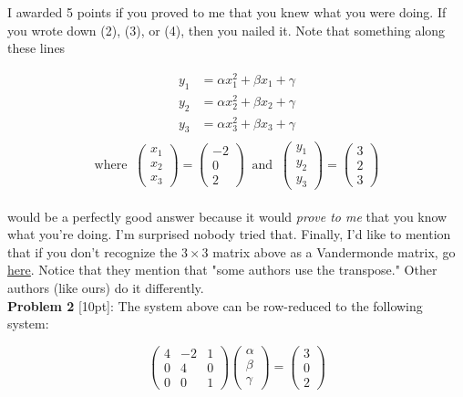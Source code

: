 \documentclass{article}
\def\a{\alpha}
\def\b{\beta}
\def\c{\gamma}
\begin{document}
I awarded 5 points if you proved to me that you knew what you were doing. If you wrote down (2), (3), or (4), then you nailed it. Note that something along these lines 

\begin{align*}
y_1 &=  \a x_1^2 + \b x_1 + \c \\
y_2 &=  \a x_2^2 + \b x_2 + \c \\
y_3 &=  \a x_3^2 + \b x_3 + \c  \\
\end{align*}
\[
\text{where} \;\; \begin{pmatrix} x_1 \\ x_2 \\ x_3 \end{pmatrix} = \begin{pmatrix} -2 \\ 0 \\ 2 \end{pmatrix} \;\; \text{and} \;\; \begin{pmatrix} y_1 \\ y_2 \\ y_3 \end{pmatrix} = \begin{pmatrix} 3 \\ 2 \\ 3 \end{pmatrix}
\] \\

{\setlength{\parindent}{0cm}
would be a perfectly good answer because it would \textit{prove to me} that you know what you're doing. I'm surprised nobody tried that. Finally, I'd like to mention that if you don't  recognize the $3 \times 3$ matrix above as a Vandermonde matrix, go {\color{cyan} \underline{\href{http://en.wikipedia.org/wiki/Vandermonde_matrix}{here}}}. Notice that they mention that "some authors use the transpose." Other authors (like ours) do it differently.}\\

\textbf{Problem 2} [10pt]: The system above can be row-reduced to the following system:

\[
\begin{pmatrix} 4 & -2 & 1 \\ 0 & 4 & 0 \\ 0 & 0 & 1 \end{pmatrix} \begin{pmatrix} \a \\ \b \\ \c \end{pmatrix} = \begin{pmatrix} 3 \\ 0 \\ 2 \end{pmatrix}
\]
\end{document}
